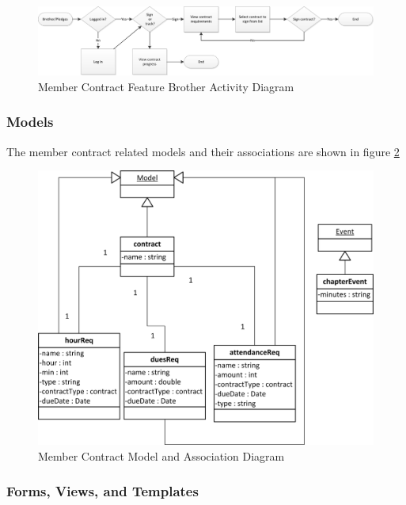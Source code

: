 \documentclass{article}
\begin{document}
\FloatBarrier
\begin{figure}
\centering
\includegraphics[scale=.65]{img/activityDiagrams/memberContractActivity2}
\caption{Member Contract Feature Brother Activity Diagram}
\label{fig:memberContractBrotherActivityDiagram}
\end{figure}
\FloatBarrier

\subsubsection{Models}

The member contract related models and their associations are shown in figure \ref{fig:memberContractModelDiagram}

\FloatBarrier
\begin{figure}[h!]
\centering
\includegraphics[scale=.65]{img/modelDiagrams/contractModel}
\caption{Member Contract Model and Association Diagram}
\label{fig:memberContractModelDiagram}
\end{figure}
\FloatBarrier

\subsubsection{Forms, Views, and Templates}
\end{document}
